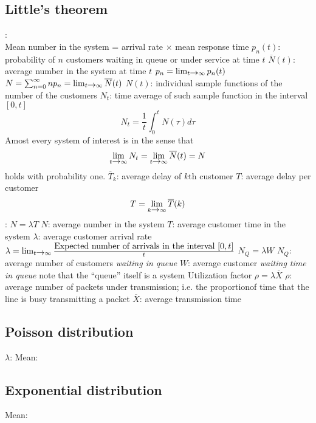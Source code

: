 \documentclass{myart}
\begin{document}
\subsection{Little's theorem}
\bit
\w {}:\\
	Mean number in the system = arrival rate $\times$
	mean response time
\w $p_n(t)$: probability of $n$ customers waiting in queue or 
	under service at time $t$
\w $\overline{N}(t)$: average number in the system at time $t$
\w {}
	\bit
	\w $p_n = \lim_{t \mbox{$\rightarrow$} \infty} p_n(t)$
	\w $N = \sum_{n=0}^\infty np_n = \lim_{t\mbox{$\rightarrow$}\infty}\overline{N}(t)$
	\eit
\w $N(t)$: individual sample functions of the number of the customers
\w $N_t$: time average of such sample function in the interval $[0, t]$
	\[ N_t = \frac{1}{t}\int_0^tN(\tau)d\tau\]
\w Amost every system of interest is  in the sense that
	\[ \lim_{t\mbox{$\rightarrow$}\infty} N_t = \lim_{t\mbox{$\rightarrow$}\infty}\overline{N}(t) = N\]
	holds with probability one.
\w $\overline{T}_k$: average delay of $k$th customer
\w $T$: average delay per customer 
	\[T = \lim_{k\mbox{$\rightarrow$}\infty}\overline{T}(k)\]
\w {}:
	$N = \lambda T$
	\bit
	\w $N$: average number in the system
	\w $T$: average customer time in the system
	\w $\lambda$: average customer arrival rate
	\w $\lambda = \lim_{t\mbox{$\rightarrow$}\infty}\frac{\mbox{Expected number of 
		arrivals in the interval $[0, t]$}}{t}$
	\eit
	\bit
\w $N_Q = \lambda W$
	\bit
	\w $N_Q$: average number of customers {\em waiting in queue\/}
	\w $W$: average customer {\em waiting time in queue\/}
	\w note that the ``queue'' itself is a system
	\eit
\w Utilization factor $\rho = \lambda\overline{X}$
	\bit
	\w $\rho$: average number of packets under transmission; i.e.
		the proportionof time that the line is busy transmitting
		a packet
	\w $\overline{X}$: average transmission time
	\eit
	\eit
	
\eit

\subsection{Poisson distribution}
\bit
\w $\lambda$:
\w Mean:
\eit

\subsection{Exponential distribution}
\bit
\w Mean:
\eit
\end{document}
